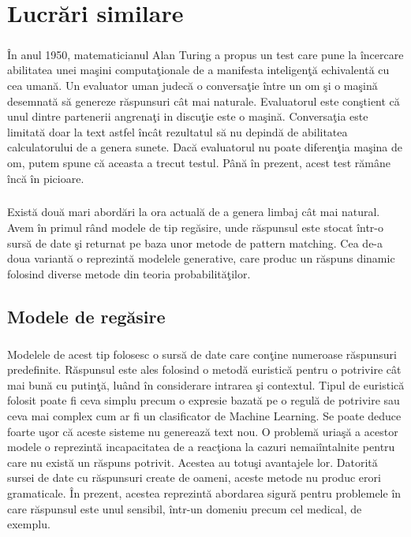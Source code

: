 \chapter{Lucr\u ari similare}

\paragraph{}
\^ In anul 1950, matematicianul Alan Turing a propus un test care pune la \^ incercare abilitatea unei ma\c sini computa\c tionale de a manifesta inteligen\c t\u a echivalent\u a cu cea uman\u a. Un evaluator uman judec\u a o conversa\c tie \^ intre un om \c si o ma\c sin\u a desemnat\u a s\u a genereze r\u aspunsuri c\^ at mai naturale. Evaluatorul este con\c stient c\u a unul dintre partenerii angrena\c ti in discu\c tie este o ma\c sin\u a. Conversa\c tia este limitat\u a doar la text astfel \^ inc\^ at rezultatul s\u a nu depind\u a de abilitatea calculatorului de a genera sunete. Dac\u a evaluatorul nu poate diferen\c tia ma\c sina de om, putem spune c\u a aceasta a trecut testul. P\^ an\u a \^ in prezent, acest test r\u am\^ ane \^ inc\u a \^ in picioare. 

\paragraph{}
Exist\u a dou\u a mari abord\u ari la ora actual\u a de a genera limbaj c\^ at mai natural. Avem \^ in primul r\^ and modele de tip reg\u asire, unde r\u aspunsul este stocat \^ intr-o surs\u a de date \c si returnat pe baza unor metode de pattern matching. Cea de-a doua variant\u a o reprezint\u a modelele generative, care produc un r\u aspuns dinamic folosind diverse metode din teoria probabilit\u a\c tilor.

\section{Modele de reg\u asire}

\paragraph{}
Modelele de acest tip folosesc o surs\u a de date care con\c tine numeroase r\u aspunsuri predefinite. R\u aspunsul este ales folosind o metod\u a euristic\u a pentru o potrivire c\^ at mai bun\u a cu putin\c t\u a, lu\^ and \^ in considerare intrarea \c si contextul. Tipul de euristic\u a folosit poate fi ceva simplu precum o expresie bazat\u a pe o regul\u a de potrivire sau ceva mai complex cum ar fi un clasificator de Machine Learning. Se poate deduce foarte u\c sor c\u a aceste sisteme nu genereaz\u a text nou. O problem\u a uria\c s\u a a acestor modele o reprezint\u a incapacitatea de a reac\c tiona la cazuri nemai\^ intalnite pentru care nu exist\u a un r\u aspuns potrivit. Acestea au totu\c si avantajele lor. Datorit\u a sursei de date cu r\u aspunsuri create de oameni, aceste metode nu produc erori gramaticale. \^ In prezent, acestea reprezint\u a abordarea sigur\u a pentru problemele \^ in care r\u aspunsul este unul sensibil, \^ intr-un domeniu precum cel medical, de exemplu. 

